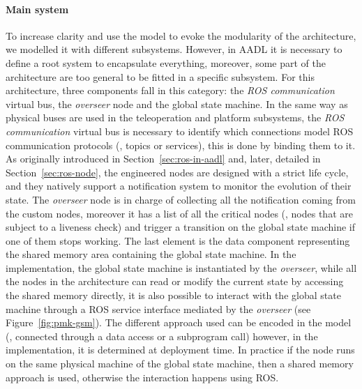 \paragraph{Main system} To increase clarity and use the model to evoke the modularity of the architecture, we modelled it with different subsystems. However, in AADL it is necessary to define a root system to encapsulate everything, moreover, some part of the architecture are too general to be fitted in a specific subsystem. For this architecture, three components fall in this category: the \textit{ROS communication} virtual bus, the \textit{overseer} node and the global state machine. In the same way as physical buses are used in the teleoperation and platform subsystems, the \textit{ROS communication} virtual bus is necessary to identify which connections model ROS communication protocols (\ie, topics or services), this is done by binding them to it. As originally introduced in Section~\ref{sec:ros-in-aadl} and, later, detailed in Section~\ref{sec:ros-node}, the engineered nodes are designed with a strict life cycle, and they natively support a notification system to monitor the evolution of their state. The \textit{overseer} node is in charge of collecting all the notification coming from the custom nodes, moreover it has a list of all the critical nodes (\ie, nodes that are subject to a liveness check) and trigger a transition on the global state machine if one of them stops working. The last element is the data component representing the shared memory area containing the global state machine. In the implementation, the global state machine is instantiated by the \textit{overseer}, while all the nodes in the architecture can read or modify the current state by accessing the shared memory directly, it is also possible to interact with the global state machine through a ROS service interface mediated by the \textit{overseer} (see Figure~\ref{fig:pmk-gsm}). The different approach used can be encoded in the model (\ie, connected through a data access or a subprogram call) however, in the implementation, it is determined at deployment time. In practice if the node runs on the same physical machine of the global state machine, then a shared memory approach is used, otherwise the interaction happens using ROS. 


